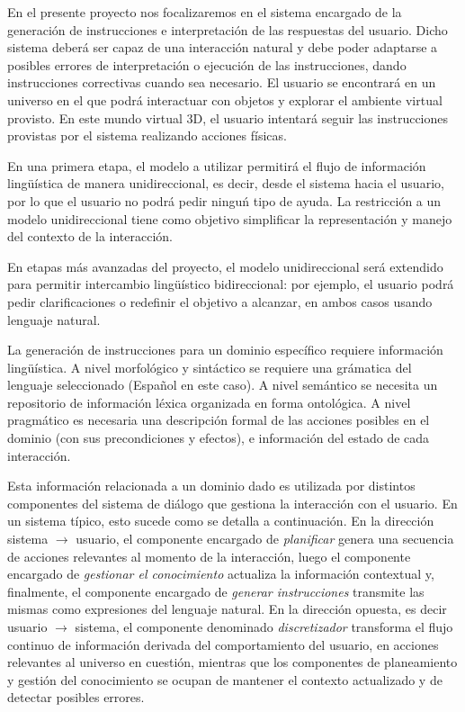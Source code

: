 

En el presente proyecto nos focalizaremos en el sistema encargado de la
generaci\'on de  instrucciones e interpretaci\'on de las respuestas del usuario.
Dicho sistema deber\'a ser capaz de una interacci\'on natural y debe poder adaptarse a
posibles errores de interpretaci\'on o ejecuci\'on de las instrucciones, dando
instrucciones correctivas cuando sea necesario. El usuario se encontrar\'a
en un universo en el que podr\'a interactuar con objetos y explorar el ambiente
virtual provisto. En este mundo virtual 3D, el usuario intentar\'a seguir las instrucciones
provistas por el sistema realizando acciones f\'isicas.

En una primera etapa, el modelo a utilizar permitir\'a el flujo de informaci\'on
ling\"u\'istica de manera unidireccional, es decir,
desde el sistema hacia el usuario, por lo que
el usuario no podr\'a pedir ningu\'n tipo de ayuda.  La restricci\'on a un
modelo unidireccional tiene como objetivo
simplificar la representaci\'on y manejo del contexto de la interacci\'on.

En etapas m\'as avanzadas del proyecto, el modelo unidireccional ser\'a
extendido para
permitir intercambio ling\"u\'istico bidireccional: por ejemplo, el usuario
podr\'a
pedir clarificaciones o redefinir el objetivo a alcanzar, en ambos casos usando
lenguaje natural.

La generaci\'on de instrucciones para un dominio espec\'ifico requiere
informaci\'on  ling\"u\'istica.
A nivel morfol\'ogico y sint\'actico se requiere una
gr\'amatica del lenguaje seleccionado (Espa\~nol en este caso). A nivel
sem\'antico se necesita un repositorio de informaci\'on l\'exica organizada en
forma ontol\'ogica. A nivel pragm\'atico es necesaria una descripci\'on formal de
las
acciones posibles en el dominio (con sus precondiciones y efectos), e
informaci\'on del estado de cada interacci\'on.

Esta informaci\'on relacionada a un dominio dado es utilizada por distintos
componentes del sistema de di\'alogo que
gestiona la interacci\'on con el usuario. En un sistema t\'ipico, esto
sucede como se detalla a continuaci\'on.  En la direcci\'on sistema $\rightarrow$
usuario, el componente encargado de \textit{planificar} genera una secuencia de
acciones relevantes al momento de la interacci\'on, luego el componente
encargado de  \textit{gestionar el conocimiento} actualiza la informaci\'on
contextual y,  finalmente, el componente encargado de
\textit{generar instrucciones}  transmite las mismas como expresiones
del lenguaje natural.  En la direcci\'on opuesta, es decir usuario $\rightarrow$
sistema,  el componente denominado \textit{discretizador}
transforma el flujo continuo de informaci\'on derivada del comportamiento del
usuario, en acciones relevantes al universo en cuesti\'on, mientras que
los componentes de planeamiento y gesti\'on del conocimiento se ocupan
de mantener el contexto actualizado y de detectar posibles errores.

